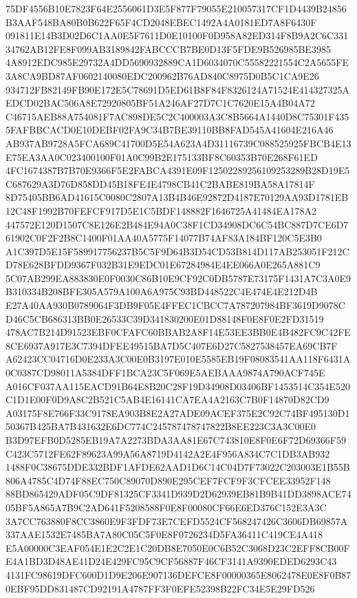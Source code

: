 \documentclass[UTF8,fontset=fandol,zihao=-4,a4paper]{ctexart}
\begin{document}
{{75DF4556B10E7823F64E2556061D3E5F877F79055E210057317CF1D4439B24856B3AAF548BA80B0B622F65F4CD2048EBEC1492A4A0181ED7A8F6430F
091811E14B3D02D6C1AA0E5F7611D0E10100F0D958A82ED314F8B9A2C6C33134762AB12FE8F099AB3189842FABCCCB7BE0D13F5FDE9B526985BE3985
4A8912EDC985E29732A4DD5690932889CA1D6034070C55582221554C2A5655FE3A8CA9BD87AF0602140080EDC200962B76AD840C8975D0B5C1CA9E26
934712FB82149FB90E172E5C78691D5ED61B8F84F8326124A71524E414327325AEDCD02BAC506A8E72920805BF51A246AF27D7C1C7620E15A4B04A72
C46715AEB88A754081F7AC898DE5C2C400003A3C8B5664A1440D8C75301F4355FAFBBCACD0E10DEBF02FA9C34B7BE39110BB8FAD545A41604E216A46
AB937AB9728A5FCA689C41700D5E54A623A4D31116739C088525925FBCB4E13E75EA3AA0C023400100F01A0C99B2E175133BF8C60353B70E268F61ED
4FC1674387B7B70E9366F5E2FABCA4391E09F12502289256109253289B28D19E5C687629A3D76D858DD45B18FE4E4798CB41C2BABE819BA58A17814F
8D75405BB6AD41615C0080C2807A13B4B46E92872D4187E70129AA93D1781EB12C48F1992B70FEFCF917D5E1C5BDF148882F1646725A41484EA178A2
447572E120D1507C8E126E2B484E94A0C38F1CD34908DC6C54BC887D7CE6D761902C0F2F2B8C1400F01AA40A5775F14077B74AF83A184BF120C5E3B0
A1C397D5E15F589917756237B5C5F9D64B3D54CD53B814D117AB253051F212CD78E628BFDD9367F032B31E9EDC01E67284984E4EE066A0E265A881C9
5C07AB299EA883830E0F0030C86B10E9CF92C0DB5787E73175F1431A7C3A0E9B310334B208BFE305A579A100A6A975C93BD448522C4E474E4E212D4B
E27A40AA930B0789064F3DB9F05E4FFEC1CBCC7A787207984BF3619D9078CD46C5CB686313BB0E26533C39D341830200E01D88148F0E8F0E2FD31519
478AC7B214D91523EBF0CFAFC60BBAB2A8F14E53EE3BB0E4B482FC9C42FE8CE6937A917E3C7394DFEE49515BA7D5C407E6D27C5827538457EA69CB7F
A62423CC04716D0E233A3C00E0B3197E010E5585EB19F08083541AA118F6431A0C0387CD98011A5384DFF1BCA23C5F069E5AEBAAA9874A790ACF745E
A016CF037AA115EACD91B64E8B20C28F19D34908D03406BF1453514C354E520C1D1E00F0D9A8C2B521C5AB4E16141CA7EA4A2163C7B0F14870D82CD9
A03175F8E766F33C9178EA903B8E2A27ADE09ACEF375E2C92C74BF495130D150367B425BA7B431632E6DC774C245787478747822B8EE223C3A3C00E0
B3D97EFB0D5285EB19A7A2273BDA3AA81E67C743810E8F0E6F72D69366F59C423C5712FE62F89623A99A56A8719D4142A2E4F956A834C7C1DB3AB932
1488F0C38675DDE332BDF1AFDE62AAD1D6C14C04D7F73022C203003E1B55B806A4785C4D74F88EC750C89070D890E295CEF7FCF9F3CFCEE33952F148
88BD865429ADF05C9DF81325CF3341D939D2D62939EB81B9B41DD3898ACE7405BF5A865A7B9C2AD641F5208588F0E8F00080CF66E6ED376C152E3A3C
3A7CC763880F8CC3860E9F3FDF73E7CEFD5524CF568247426C3606DB69857A337AAE1532E7485BA7A80C05C5F0E8F0726234D5FA36411C419CE4A418
E5A00000C3EAF054E1E2C2E1C20DB8E7050E0C6B52C3068D23C2EFF8CB00FE4A1BD3D48AE41D24E429FC95C9CF56887F46CF3141A9390EDED6293C43
4131FC98619DFC600D1D9E206E907136DEFCE8F00000365E8062478E0E8F0B870EBF95DD831487CD92191A4787FF3F0EFE52398B22FC34E5E29FD526
}}
\end{document}
